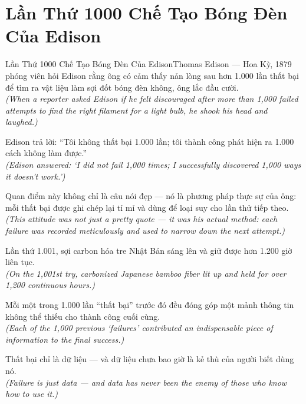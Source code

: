 \section{Lần Thứ 1000 Chế Tạo Bóng Đèn Của Edison}
\begin{truyen}{Lần Thứ 1000 Chế Tạo Bóng Đèn Của Edison}{Thomas Edison --- Hoa Kỳ, 1879}
 phóng viên hỏi Edison rằng ông có cảm thấy nản lòng sau hơn 1.000 lần thất bại để tìm ra vật liệu làm sợi đốt bóng đèn không, ông lắc đầu cười.\\[4pt]
\textit{(When a reporter asked Edison if he felt discouraged after more than 1,000 failed attempts to find the right filament for a light bulb, he shook his head and laughed.)}

Edison trả lời: ``Tôi không thất bại 1.000 lần; tôi thành công phát hiện ra 1.000 cách không làm được.''\\[4pt]
\textit{(Edison answered: `I did not fail 1,000 times; I successfully discovered 1,000 ways it doesn't work.')}

Quan điểm này không chỉ là câu nói đẹp --- nó là phương pháp thực sự của ông: mỗi thất bại được ghi chép lại tỉ mỉ và dùng để loại suy cho lần thử tiếp theo.\\[4pt]
\textit{(This attitude was not just a pretty quote --- it was his actual method: each failure was recorded meticulously and used to narrow down the next attempt.)}

Lần thứ 1.001, sợi carbon hóa tre Nhật Bản sáng lên và giữ được hơn 1.200 giờ liên tục.\\[4pt]
\textit{(On the 1,001st try, carbonized Japanese bamboo fiber lit up and held for over 1,200 continuous hours.)}

Mỗi một trong 1.000 lần ``thất bại'' trước đó đều đóng góp một mảnh thông tin không thể thiếu cho thành công cuối cùng.\\[4pt]
\textit{(Each of the 1,000 previous `failures' contributed an indispensable piece of information to the final success.)}

\end{truyen}
\begin{baihoc}
  Thất bại chỉ là dữ liệu --- và dữ liệu chưa bao giờ là kẻ thù của người biết dùng nó.\\[4pt]
  \textit{(Failure is just data --- and data has never been the enemy of those who know how to use it.)}
\end{baihoc}

